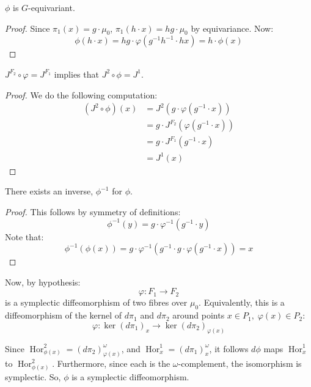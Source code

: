 \begin{lemma}\label{lem:phi-equivariant}
$\phi$ is $G$-equivariant. 
\end{lemma}
\begin{proof}
Since $\pi_{1}(x) = g \cdot \mu_{0}$, $\pi_{1}(h \cdot x) = hg \cdot \mu_{0}$ by equivariance. Now: 
\begin{equation}
\phi(h \cdot x) = hg \cdot \varphi(g^{-1} h^{-1} \cdot h x) = h \cdot \phi(x)
\end{equation} \end{proof}
\begin{lemma}\label{lem:moment-maps-agree}
$J^{F_{2}} \circ \varphi = J^{F_{1}}$ implies that $J^{2} \circ \phi = J^{1}$.
\end{lemma}
\begin{proof}
We do the following computation: \begin{align}
(J^{2} \circ \phi)(x) &= J^{2}(g \cdot \varphi(g^{-1} \cdot x))\\
&= g \cdot J^{F_{2}}(\varphi(g^{-1} \cdot x))\\
&= g \cdot J^{F_{1}}(g^{-1} \cdot x)\\
&= J^{1}(x)
\end{align}
\end{proof}
\begin{lemma}\label{lem:phi-inverse}
There exists an inverse, $\phi^{-1}$ for $\phi$. 
\end{lemma}
\begin{proof}
This follows by symmetry of definitions:
\begin{equation}
\phi^{-1}(y) = g \cdot \varphi^{-1}(g^{-1} \cdot y)
\end{equation}
Note that:
\begin{equation}
\phi^{-1}(\phi(x)) = g \cdot \varphi^{-1}(g^{-1} \cdot g \cdot \varphi(g^{-1} \cdot x)) = x
\end{equation}
\end{proof}
Now, by hypothesis:
\begin{equation}
\varphi: F_{1} \to F_{2}
\end{equation}
\noindent is a symplectic diffeomorphism of two fibres over $\mu_{0}$. Equivalently, this is a diffeomorphism of the kernel of $d \pi_{1}$ and $d \pi_{2}$ around points $x \in P_{1}, \; \varphi(x) \in P_{2}$:
\begin{equation}
\varphi: \ker (d\pi_{1})_{x} \to \ker (d\pi_{2})_{\varphi(x)}
\end{equation}

\noindent Since $\operatorname{Hor}_{\phi(x)}^{2} = (d\pi_{2})_{\varphi(x)}^{\omega}$, and $\operatorname{Hor}_{x}^{1} = (d\pi_{1})_{x}^{\omega}$, it follows $d\phi$ maps $\operatorname{Hor}_{x}^{1}$ to $\operatorname{Hor}_{\phi(x)}^{2}$. Furthermore, since each is the $\omega$-complement, the isomorphism is symplectic. So, $\phi$ is a symplectic diffeomorphism. 

